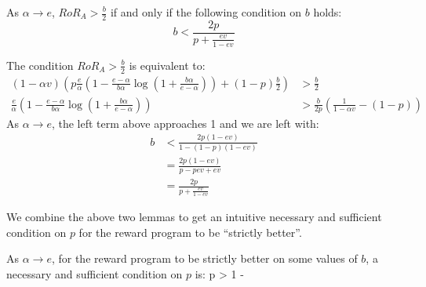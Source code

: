 \begin{lemma}
As $\alpha \rightarrow e$, $RoR_A > \frac{b}{2}$ if and only if the following condition on $b$ holds:
\begin{equation}
b < \frac{2p}{p+\frac{ev}{1-ev}}
\end{equation}
\end{lemma} 

\proof
The condition $RoR_A > \frac{b}{2}$ is equivalent to:
\begin{align*}
(1-\alpha v)\left(p \frac{e}{\alpha}\left(1-\frac{e-\alpha}{b\alpha}\log \left(1+\frac{b\alpha}{e-\alpha} \right) \right)+(1-p)\frac{b}{2}\right) &> \frac{b}{2} \\
\frac{e}{\alpha} \left(1-\frac{e-\alpha}{b\alpha}\log \left(1+\frac{b\alpha}{e-\alpha} \right) \right) &> \frac{b}{2p}\left(\frac{1}{1-\alpha v}-(1-p) \right)
\end{align*}
As $\alpha \rightarrow e$, the left term above approaches 1 and we are left with:
\begin{align*}
b &< \frac{2 p (1-ev)}{1-(1-p)(1-ev)} \\
&= \frac{2p(1-ev)}{p-pev+ev} \\
&= \frac{2p}{p+\frac{ev}{1-ev}}
\end{align*}
\endproof

We combine the above two lemmas to get an intuitive necessary and sufficient condition on $p$ for the reward program to be ``strictly better''. 

\begin{lemma}
As $\alpha \rightarrow e$, for the reward program to be strictly better on some values of $b$, a necessary and sufficient condition on $p$ is:
\beq
\label{eq:necp}
p > 1 - 
\eeq
\end{lemma}

